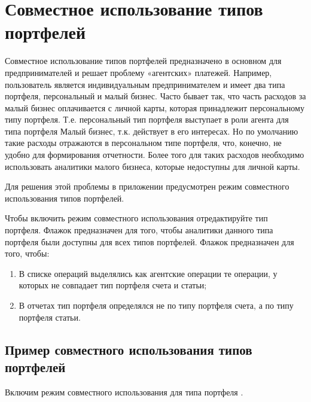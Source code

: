 \documentclass[a4paper,10pt,russian]{sphinxmanual}
\begin{document}
\chapter{Совместное использование типов портфелей}
\label{\detokenize{shared-transactions:chapter-shared-transactions}}\label{\detokenize{shared-transactions:id1}}\label{\detokenize{shared-transactions::doc}}
Совместное использование типов портфелей предназначено в основном для предпринимателей
и решает проблему «агентских» платежей. Например, пользователь является
индивидуальным предпринимателем и имеет два типа портфеля, персональный и малый бизнес.
Часто бывает так, что часть расходов за малый бизнес оплачивается с личной
карты, которая принадлежит персональному типу портфеля. Т.е. персональный тип портфеля
выступает в роли агента для типа портфеля Малый бизнес, т.к. действует в его интересах.
Но по умолчанию такие расходы отражаются в персональном типе портфеля, что, конечно,
не удобно для формирования отчетности. Более того для таких расходов необходимо
использовать аналитики малого бизнеса, которые недоступны для личной карты.

Для решения этой проблемы в приложении предусмотрен режим совместного использования типов
портфелей.

Чтобы включить режим совместного использования отредактируйте тип портфеля.
Флажок  предназначен для того, чтобы аналитики данного типа портфеля
были доступны для всех типов портфелей.
Флажок  предназначен для того, чтобы:
\begin{enumerate}
\def\theenumi{\arabic{enumi}}
\def\labelenumi{\theenumi .}
\makeatletter\def\p@enumii{\p@enumi \theenumi .}\makeatother
\item {} 
В списке операций выделялись как агентские операции те операции, у которых не совпадает тип портфеля счета и статьи;

\item {} 
В отчетах тип портфеля определялся не по типу портфеля счета, а по типу портфеля статьи.

\end{enumerate}


\section{Пример совместного использования типов портфелей}
\label{\detokenize{shared-transactions:id2}}
Включим режим совместного использования для типа портфеля .
\end{document}
